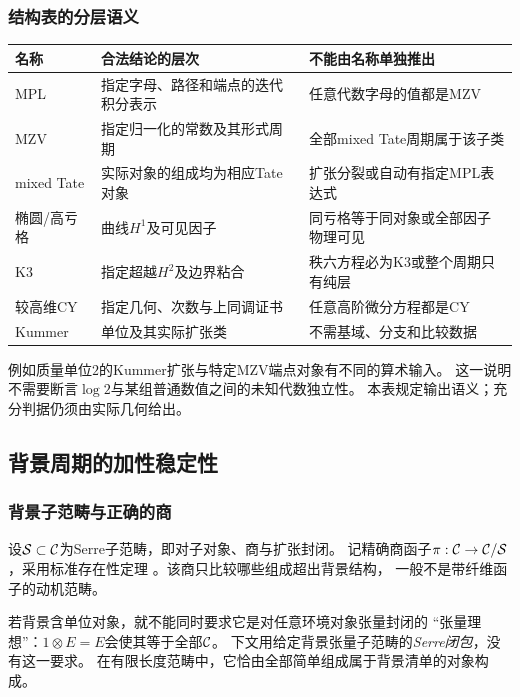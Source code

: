 \documentclass[11pt,a4paper,oneside]{ctexart}
\theoremstyle{cnplain}
\theoremstyle{definition}
\theoremstyle{remark}
\numberwithin{equation}{section}
\begin{document}
\subsubsection{结构表的分层语义}
\begin{center}\small
\begin{tabular}{p{24mm}p{47mm}p{72mm}}
\toprule 名称&合法结论的层次&不能由名称单独推出\\\midrule
MPL&指定字母、路径和端点的迭代积分表示&任意代数字母的值都是MZV\\
MZV&指定归一化的常数及其形式周期&全部mixed Tate周期属于该子类\\
mixed Tate&实际对象的组成均为相应Tate对象&扩张分裂或自动有指定MPL表达式\\
椭圆/高亏格&曲线$H^1$及可见因子&同亏格等于同对象或全部因子物理可见\\
K3&指定超越$H^2$及边界粘合&秩六方程必为K3或整个周期只有纯层\\
较高维CY&指定几何、次数与上同调证书&任意高阶微分方程都是CY\\
Kummer&单位及其实际扩张类&不需基域、分支和比较数据\\\bottomrule
\end{tabular}
\end{center}
例如质量单位$2$的Kummer扩张与特定MZV端点对象有不同的算术输入。
这一说明不需要断言$\log2$与某组普通数值之间的未知代数独立性。
本表规定输出语义；充分判据仍须由实际几何给出。


\subsection{背景周期的加性稳定性}
\subsubsection{背景子范畴与正确的商}
设$\mathcal S\subset\mathcal C$为Serre子范畴，即对子对象、商与扩张封闭。
记精确商函子$\pi:\mathcal C\to\mathcal C/\mathcal S$，采用标准存在性定理
\cite[Tag 02MS]{stacks}。该商只比较哪些组成超出背景结构，
一般不是带纤维函子的动机范畴。

若背景含单位对象，就不能同时要求它是对任意环境对象张量封闭的
“张量理想”：$1\otimes E=E$会使其等于全部$\mathcal C$。
下文用给定背景张量子范畴的\emph{Serre闭包}，没有这一要求。
在有限长度范畴中，它恰由全部简单组成属于背景清单的对象构成。
\end{document}
